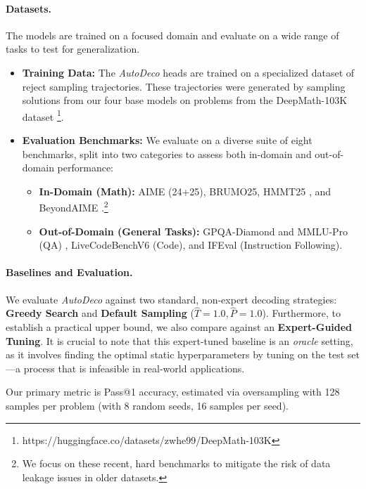 \paragraph{Datasets.}
The models are trained on a focused domain and evaluate on a wide range of tasks to test for generalization.
\begin{itemize}[leftmargin=2em, ]
    \item \textbf{Training Data:} The \textit{AutoDeco} heads are trained on a specialized dataset of reject sampling trajectories. These trajectories were generated by sampling solutions from our four base models on problems from the DeepMath-103K dataset \citep{he2025deepmath}\footnote{https://huggingface.co/datasets/zwhe99/DeepMath-103K}.
    \item \textbf{Evaluation Benchmarks:} We evaluate on a diverse suite of eight benchmarks, split into two categories to assess both in-domain and out-of-domain performance:
    \begin{itemize}[leftmargin=1em, topsep=0pt, itemsep=0pt]
        \item \textbf{In-Domain (Math):} AIME (24+25), BRUMO25, HMMT25 \citep{balunovic_srimatharena_2025}, and BeyondAIME \citep{bytedance_seed_2025_beyondaime}.\footnote{We focus on these recent, hard benchmarks to mitigate the risk of data leakage issues in older datasets.}
        \item \textbf{Out-of-Domain (General Tasks):} GPQA-Diamond \citep{rein2024gpqa} and MMLU-Pro \citep{wang2024mmlu} (QA) , LiveCodeBenchV6 \citep{jain2024LiveCodeBench} (Code), and IFEval \citep{zhou2023instruction} (Instruction Following).
    \end{itemize}
\end{itemize}

\paragraph{Baselines and Evaluation.}
We evaluate \textit{AutoDeco} against two standard, non-expert decoding strategies: \textbf{Greedy Search} and \textbf{Default Sampling} ($\hat{T}=1.0, \hat{P}=1.0$). Furthermore, to establish a practical upper bound, we also compare against an \textbf{Expert-Guided Tuning}. It is crucial to note that this expert-tuned baseline is an \textit{oracle} setting, as it involves finding the optimal static hyperparameters by tuning on the test set—a process that is infeasible in real-world applications.

Our primary metric is Pass@1 accuracy, estimated via oversampling with 128 samples per problem (with 8 random seeds, 16 samples per seed).



